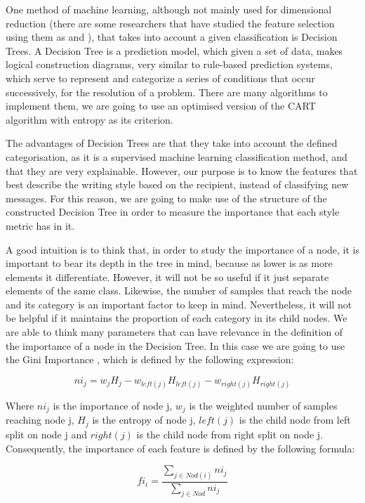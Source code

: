 One method of machine learning, although not mainly used for dimensional reduction (there are some researchers that have studied the feature selection using them as \cite{sugumaran2007feature} and \cite{cho2011decision}), that takes into account a given classification is Decision Trees. A Decision Tree \citep{rokach2008data} is a prediction model, which given a set of data, makes logical construction diagrams, very similar to rule-based prediction systems, which serve to represent and categorize a series of conditions that occur successively, for the resolution of a problem. There are many algorithms to implement them, we are going to use an optimised version of the CART algorithm \citep{breiman1984classification} with entropy as its criterion.

The advantages of Decision Trees are that they take into account the defined categorisation, as it is a supervised machine learning classification method, and that they are very explainable. However, our purpose is to know the features that best describe the writing style based on the recipient, instead of classifying new messages. For this reason, we are going to make use of the structure of the constructed Decision Tree in order to measure the importance that each style metric has in it.

A good intuition is to think that, in order to study the importance of a node, it is important to bear its depth in the tree in mind, because as lower is as more elements it differentiate. However, it will not be so useful if it just separate elements of the same class. Likewise, the number of samples that reach the node and its category is an important factor to keep in mind. Nevertheless, it will not be helpful if it maintains the proportion of each category in its child nodes. We are able to think many parameters that can have relevance in the definition of the importance of a node in the Decision Tree. In this case we are going to use the Gini Importance \citep{breiman2001random}, which is defined by the following expression:

$$
ni_j = w_jH_j - w_{left(j)}H_{left(j)} - w_{right(j)}H_{right(j)}
$$

Where $ni_j$ is the importance of node j, $w_j$ is the weighted number of samples reaching node j, $H_j$ is the entropy of node j, $left(j)$ is the child node from left split on node j and $right(j)$ is the child node from right split on node j. Consequently, the importance of each feature is defined by the following formula:

$$
fi_i = \frac{\sum_{j\in Nod(i)}ni_j}{\sum_{j\in Nod}ni_j}
$$

